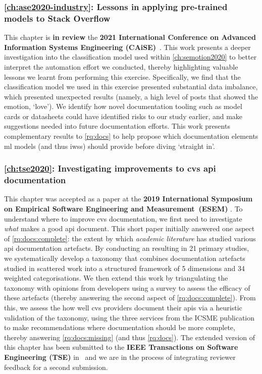 \subsubsection{\cref{ch:ase2020-industry}: Lessons in applying pre-trained models to Stack Overflow} This chapter is \textbf{in review} the \textbf{2021 International Conference on Advanced Information Systems Engineering (CAiSE)}~\citep{Graetsch:2020ase-industry}. This work presents a deeper investigation into the classification model used within \cref{ch:semotion2020} to better interpret the automation effort we conducted, thereby highlighting valuable lessons we learnt from performing this exercise. Specifically, we find that the classification model we used in this exercise presented substantial data imbalance, which presented unexpected results (namely, a high level of posts that showed the emotion, `love'). We identify how novel documentation tooling such as model cards \citep{Mitchell:2018in} or datasheets \citep{Gebru:2018wh} could have identified risks to our study earlier, and make suggestions needed into future documentation efforts. This work presents complementary  results to \ref{rq:docs} to help propose which documentation elements \gls{ml} models (and thus \glspl{iws}) should provide before diving `straight in'.

\subsubsection{\cref{ch:tse2020}: Investigating improvements to \gls{cvs} \gls{api} documentation} This chapter was accepted as a paper at the \textbf{2019 International Symposium on Empirical Software Engineering and Measurement~(ESEM)} \citep{Cummaudo:2020icse}. To understand where to improve \gls{cvs} documentation, we first need to investigate \textit{what} makes a good \gls{api} document. This short paper initially answered one aspect of \ref{rq:docs:complete}: the extent by which \textit{academic literature} has studied various \gls{api} documentation artefacts. By conducting an  resulting in 21 primary studies, we systematically develop a taxonomy that combines documentation artefacts studied in scattered work into a structured framework of 5 dimensions and 34 weighted categorisations. We then extend this work by triangulating the taxonomy with opinions from developers using a survey to assess the efficacy of these artefacts (thereby answering the second aspect of \ref{rq:docs:complete}). From this, we assess the how well \gls{cvs} providers document their \glspl{api} via a heuristic validation of the taxonomy, using the three services from the ICSME publication to make recommendations where documentation should be more complete, thereby answering \ref{rq:docs:missing} (and thus \ref{rq:docs}). The extended version of this chapter has been submitted to the \textbf{IEEE Transactions on Software Engineering (TSE)} in~\citep{Cummaudo:2020tse} and we are in the process of integrating reviewer feedback for a second submission.

